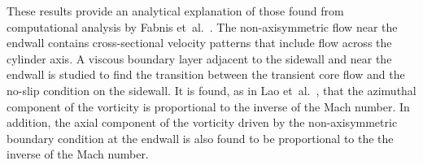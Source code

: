 These results provide an analytical explanation of those
found from computational analysis by Fabnis
et~al.\ \cite{fabnis}.  The non-axisymmetric flow near the
endwall contains cross-sectional velocity patterns that
include flow across the cylinder axis.  A viscous boundary
layer adjacent to the sidewall and near the endwall is
studied to find the transition between the transient core
flow and the no-slip condition on the sidewall.
It is found, as in Lao et~al.\ \cite{lao:paper}, that the
azimuthal component of the vorticity is proportional to
the inverse of the Mach number.  In addition, the axial
component of the vorticity driven by the non-axisymmetric
boundary condition at the endwall is also found to be
proportional to the the inverse of the Mach number.


